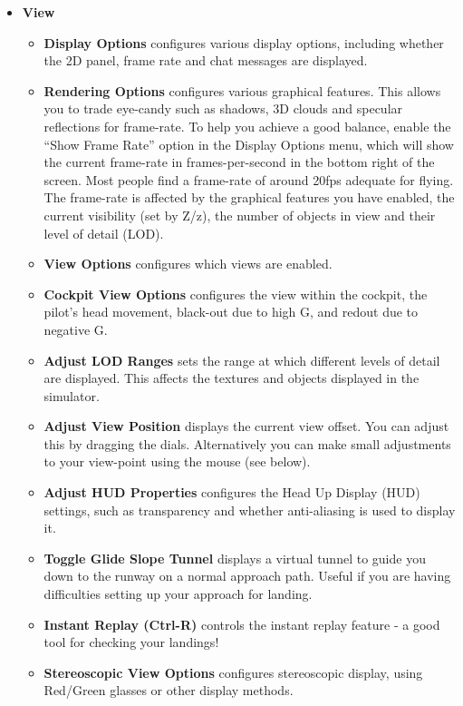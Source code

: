 \begin{itemize}
 \item \textbf{View}
 \begin{itemize}
  \item \textbf{Display Options} configures various display options, including whether
  the 2D panel, frame rate and chat messages are displayed.
  \item \textbf{Rendering Options} configures various graphical features.
  This allows you to trade eye-candy such as shadows, 3D clouds and specular
reflections for frame-rate.
  To help you achieve a good balance, enable the ``Show Frame Rate'' option in the
Display Options menu, which will show the current frame-rate in frames-per-second
in the bottom right of the screen.
  Most people find a frame-rate of around 20fps adequate for flying. The
frame-rate is affected by the
  graphical features you have enabled, the current visibility (set by Z/z), the
number of objects in view
  and their level of detail (LOD).
  \item \textbf{View Options} configures which views are enabled.
  \item \textbf{Cockpit View Options} configures
the view within the cockpit, the pilot's head movement, black-out due
to high G, and redout due to negative G.
  \item \textbf{Adjust LOD Ranges} sets the range at which different
  levels of detail are displayed. This affects the textures and objects
displayed in the simulator.
  \item \textbf{Adjust View Position} displays the current view offset.
  You can adjust this by dragging the dials. Alternatively you can make small
adjustments   to your view-point using the mouse (see below).
  \item \textbf{Adjust HUD Properties} configures the Head Up Display (HUD)
settings, such as transparency and whether anti-aliasing is used to display it.
 \item \textbf{Toggle Glide Slope Tunnel} displays a virtual tunnel to guide
 you down to the runway on a normal approach path. Useful if you are having
 difficulties setting up your approach for landing.
  \item \textbf{Instant Replay (Ctrl-R)} controls the instant replay
feature - a good tool for checking your landings!
   \item \textbf{Stereoscopic View Options} configures stereoscopic display,
   using Red/Green glasses or other display methods.
\end{itemize}


\end{itemize}
